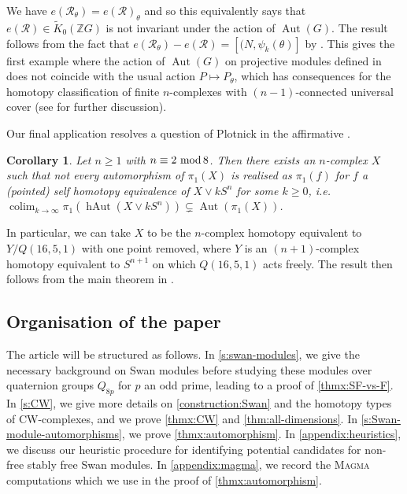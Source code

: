\documentclass[11pt,leqno,a4paper]{amsart}
\newcommand{\Z}{\mathbb{Z}}
\renewcommand{\mod}{\,\,\text{\normalfont mod}\,}
\DeclareMathOperator{\Aut}{Aut}
\DeclareMathOperator{\colim}{colim}
\DeclareMathOperator{\hAut}{hAut}
\newtheorem{corollary}[thm]{Corollary}
\theoremstyle{definition}
\theoremstyle{remark}
\theoremstyle{custom}
\newcommand{\wt}{\widetilde}
\begin{document}
We have $e(\mathscr{R}_\theta) = e(\mathscr{R})_\theta$ and so this equivalently says that $e(\mathscr{R}) \in \wt K_0(\Z G)$ is not invariant under the action of $\Aut(G)$.
The result follows from the fact that $e(\mathscr{R}_\theta) - e(\mathscr{R}) = [(N,\psi_k(\theta)]$ by \cite[Proposition 3.4 \& Section 6.2]{Ni20a}.
This gives the first example where the action of $\Aut(G)$ on projective modules defined in \cite[Theorem B]{Ni20a} does not coincide with the usual action $P \mapsto P_\theta$, which has consequences for the homotopy classification of finite $n$-complexes with $(n-1)$-connected universal cover (see \cite[Section 1.2]{Ni20a} for further discussion).

Our final application resolves a question of Plotnick in the affirmative \cite[p98]{Pl82}.

\begin{corollary}
Let $n \ge 1$ with $n \equiv 2 \mod 8$. Then there exists an $n$-complex $X$ such that not every automorphism of $\pi_1(X)$ is realised as $\pi_1(f)$ for $f$ a (pointed) self homotopy equivalence of $X \vee k S^n$ for some $k \ge 0$, i.e.~$\colim_{k \to \infty} \pi_1(\hAut(X \vee k S^n)) \subsetneq \Aut(\pi_1(X))$. 
\end{corollary}

In particular, we can take $X$ to be the $n$-complex homotopy equivalent to $Y/Q(16,5,1)$ with one point removed, where $Y$ is an $(n+1)$-complex homotopy equivalent to $S^{n+1}$ on which $Q(16,5,1)$ acts freely. The result then follows from the main theorem in \cite{Pl82}.

\subsection*{Organisation of the paper} The article will be structured as follows. 
In \cref{s:swan-modules}, we give the necessary background on Swan modules before studying these modules over quaternion groups $Q_{8p}$ for $p$ an odd prime, leading to a proof of \cref{thmx:SF-vs-F}.
In \cref{s:CW}, we give more details on \cref{construction:Swan} and the homotopy types of CW-complexes, and we prove \cref{thmx:CW} and \cref{thm:all-dimensions}. In \cref{s:Swan-module-automorphisms}, we prove \cref{thmx:automorphism}. In \cref{appendix:heuristics}, we discuss our heuristic procedure for identifying potential candidates for non-free stably free Swan modules. In \cref{appendix:magma}, we record the \textsc{Magma} computations which we use in the proof of \cref{thmx:automorphism}.
\end{document}
